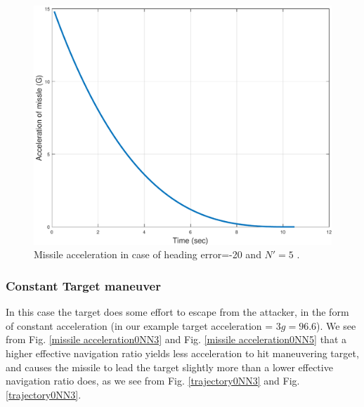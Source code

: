\begin{figure}[htb]
	\centering
	\includegraphics[scale = 0.75]{fig/MissileAcceleration20N5.pdf}
	\caption{Missile acceleration in case of heading error=-20 and $N'=5$ .}
	\label{missile acceleration20N5}
\end{figure}


\subsubsection{Constant Target maneuver}
In this case the target does some effort to escape from the attacker, in the form of constant acceleration (in our example target acceleration = $3g=96.6$).
We see from Fig. \ref{missile acceleration0NN3} and Fig. \ref{missile acceleration0NN5} that a higher effective navigation ratio yields less acceleration to hit maneuvering target, and causes the missile to lead the target slightly more than a lower effective navigation ratio does, as we see from Fig. \ref{trajectory0NN3} and Fig. \ref{trajectory0NN3}.



